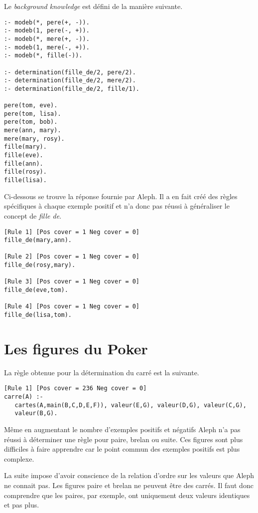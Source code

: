 \documentclass[a4paper,12pt]{article}
\begin{document}
Le \textit{background knowledge} est défini de la manière suivante.

\begin{lstlisting}[frame=single]
:- modeb(*, pere(+, -)).
:- modeb(1, pere(-, +)).
:- modeb(*, mere(+, -)).
:- modeb(1, mere(-, +)).
:- modeb(*, fille(-)).

:- determination(fille_de/2, pere/2).
:- determination(fille_de/2, mere/2).
:- determination(fille_de/2, fille/1).

pere(tom, eve).
pere(tom, lisa).
pere(tom, bob).
mere(ann, mary).
mere(mary, rosy).
fille(mary).
fille(eve).
fille(ann).
fille(rosy).
fille(lisa).
\end{lstlisting}

Ci-dessous se trouve la réponse fournie par Aleph.
Il a en fait créé des règles spécifiques à chaque exemple positif et n'a donc pas réussi à généraliser le concept de \textit{fille de}.

\begin{lstlisting}[frame=single]
[Rule 1] [Pos cover = 1 Neg cover = 0]
fille_de(mary,ann).

[Rule 2] [Pos cover = 1 Neg cover = 0]
fille_de(rosy,mary).

[Rule 3] [Pos cover = 1 Neg cover = 0]
fille_de(eve,tom).

[Rule 4] [Pos cover = 1 Neg cover = 0]
fille_de(lisa,tom).
\end{lstlisting}

\section{Les figures du Poker}

La règle obtenue pour la détermination du carré est la suivante.

\begin{lstlisting}[frame=single]
[Rule 1] [Pos cover = 236 Neg cover = 0]
carre(A) :-
   cartes(A,main(B,C,D,E,F)), valeur(E,G), valeur(D,G), valeur(C,G), 
   valeur(B,G).
\end{lstlisting}

Même en augmentant le nombre d'exemples positifs et négatifs Aleph n'a pas réussi à déterminer une règle pour paire, brelan ou suite.
Ces figures sont plus difficiles à faire apprendre car le point commun des exemples positifs est plus complexe.

La suite impose d'avoir conscience de la relation d'ordre sur les valeurs que Aleph ne connait pas.
Les figures paire et brelan ne peuvent être des carrés.
Il faut donc comprendre que les paires, par exemple, ont uniquement deux valeurs identiques et pas plus.
\end{document}
